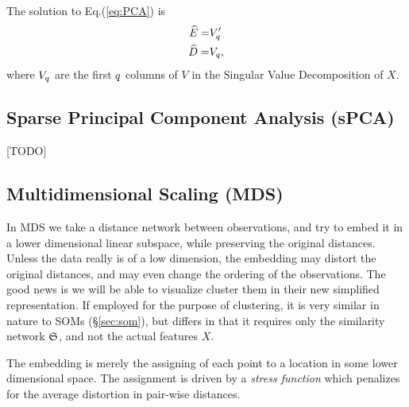 The solution to Eq.(\ref{eq:PCA}) is 
\begin{align}
\label{eq:PCA_solution}
	\widehat{E} =& V_q' \\
	\widehat{D} =& V_q,
\end{align}
where $V_q$ are the first $q$ columns of $V$ in the Singular Value Decomposition of $X$.









\subsection{Sparse Principal Component Analysis (sPCA)}
[TODO]






\subsection{Multidimensional Scaling (MDS)}
\label{sec:MDS}

In MDS we take a distance network between observations, and try to embed it in a lower dimensional linear subspace, while preserving the original distances.
Unless the data really is of a low dimension, the embedding may distort the original distances, and may even change the ordering of the observations. The good news is we will be able to visualize \andor cluster them in their new simplified representation. 
If employed for the purpose of clustering, it is very similar in nature to SOMs (\S\ref{sec:som}), but differs in that it requires only the similarity network $\mathfrak{S}$, and not the actual features $X$. 

The embedding is merely the assigning of each point to a location in some lower dimensional space. The assignment is driven by a \emph{stress function} which penalizes for the average distortion in pair-wise distances.


